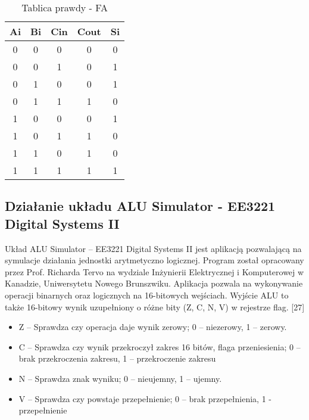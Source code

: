 \documentclass[12pt, a4paper, onside, polish]{article}				%
\begin{document}
\begin{table}[H]
\noindent
\caption{Tablica prawdy - FA}
\centering
\begin{tabular}{|c|c|c|c|c|}
\hline
\textbf{Ai} & \textbf{Bi} & \textbf{Cin} & \textbf{Cout} & \textbf{Si} \\ \hline
0           & 0           & 0            & 0             & 0           \\ \hline
0           & 0           & 1            & 0             & 1           \\ \hline
0           & 1           & 0            & 0             & 1           \\ \hline
0           & 1           & 1            & 1             & 0           \\ \hline
1           & 0           & 0            & 0             & 1           \\ \hline
1           & 0           & 1            & 1             & 0           \\ \hline
1           & 1           & 0            & 1             & 0           \\ \hline
1           & 1           & 1            & 1             & 1           \\ \hline 
\end{tabular}
\vspace{0.5cm}
\end{table}

\subsection{Działanie układu ALU Simulator - EE3221 Digital Systems II}
\hspace{\parindent}
Układ ALU Simulator – EE3221 Digital Systems II jest aplikacją pozwalającą na symulacje działania jednostki arytmetyczno logicznej. Program został opracowany przez Prof. Richarda Tervo na wydziale Inżynierii Elektrycznej i Komputerowej w Kanadzie, Uniwersytetu Nowego Brunszwiku. Aplikacja pozwala na wykonywanie operacji binarnych oraz logicznych na 16-bitowych wejściach. Wyjście ALU to także 16-bitowy wynik uzupełniony o różne bity (Z, C, N, V) w rejestrze flag. [27]
\begin{itemize}
\item Z – Sprawdza czy operacja daje wynik zerowy; 0 – niezerowy, 1 – zerowy.
\item C – Sprawdza czy wynik przekroczył zakres 16 bitów, flaga przeniesienia; 0 – brak przekroczenia zakresu, 1 – przekroczenie zakresu
\item N – Sprawdza znak wyniku; 0 – nieujemny, 1 – ujemny.
\item V – Sprawdza czy powstaje przepełnienie; 0 – brak przepełnienia, 1 - przepełnienie \newline
\end{itemize}
\end{document}
